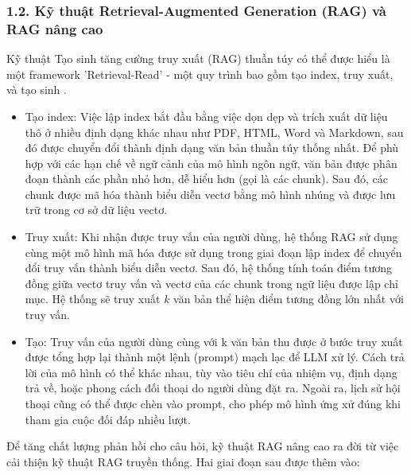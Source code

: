 \subsubsection*{1.2. Kỹ thuật Retrieval-Augmented Generation (RAG) và RAG nâng cao}
Kỹ thuật Tạo sinh tăng cường truy xuất (RAG) thuần túy có thể được hiểu là một framework 'Retrieval-Read' - một quy trình bao gồm tạo index, truy xuất, và tạo sinh \cite{gao2024retrievalaugmentedgenerationlargelanguage}.

\begin{itemize}
	\item Tạo index: Việc lập index bắt đầu bằng việc dọn dẹp và trích xuất dữ liệu thô ở nhiều định dạng khác nhau như PDF, HTML, Word và Markdown, sau đó được chuyển đổi thành định dạng văn bản thuần túy thống nhất. Để phù hợp với các hạn chế về ngữ cảnh của mô hình ngôn ngữ, văn bản được phân đoạn thành các phần nhỏ hơn, dễ hiểu hơn (gọi là các chunk). Sau đó, các chunk được mã hóa thành biểu diễn vectơ bằng mô hình nhúng và được lưu trữ trong cơ sở dữ liệu vectơ. 
	
	\item Truy xuất: Khi nhận được truy vấn của người dùng, hệ thống RAG sử dụng cùng một mô hình mã hóa được sử dụng trong giai đoạn lập index để chuyển đổi truy vấn thành biểu diễn vectơ. Sau đó, hệ thống tính toán điểm tương đồng giữa vectơ truy vấn và vectơ của các chunk trong ngữ liệu được lập chỉ mục. Hệ thống sẽ truy xuất $k$ văn bản thể hiện điểm tương đồng lớn nhất với truy vấn. 
	
	\item Tạo: Truy vấn của người dùng cùng với k văn bản thu được ở bước truy xuất được tổng hợp lại thành một lệnh (prompt) mạch lạc để LLM xử lý. Cách trả lời của mô hình có thể khác nhau, tùy vào tiêu chí của nhiệm vụ, định dạng trả về, hoặc phong cách đối thoại do người dùng đặt ra. Ngoài ra, lịch sử hội thoại cũng có thể được chèn vào prompt, cho phép mô hình ứng xử đúng khi tham gia cuộc đối đáp nhiều lượt.

\end{itemize}

Để tăng chất lượng phản hồi cho câu hỏi, kỹ thuật RAG nâng cao ra đời từ việc cải thiện kỹ thuật RAG truyền thống. Hai giai đoạn sau được thêm vào:

